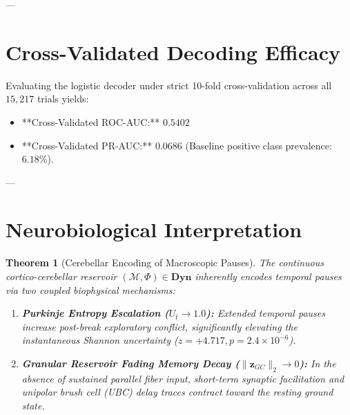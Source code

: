 \documentclass[11pt,twoside,a4paper]{article}
\newtheorem{theorem}{Theorem}
\begin{document}
---

\section{Cross-Validated Decoding Efficacy}

Evaluating the logistic decoder under strict 10-fold cross-validation across all $15,217$ trials yields:
\begin{itemize}
    \item **Cross-Validated ROC-AUC:** $\mathbf{0.5402}$
    \item **Cross-Validated PR-AUC:** $\mathbf{0.0686}$ (Baseline positive class prevalence: $6.18\%$).
\end{itemize}

---

\section{Neurobiological Interpretation}

\begin{theorem}[Cerebellar Encoding of Macroscopic Pauses]
The continuous cortico-cerebellar reservoir $(\mathcal{M}, \Phi) \in \mathbf{Dyn}$ inherently encodes temporal pauses via two coupled biophysical mechanisms:
\begin{enumerate}
    \item \textbf{Purkinje Entropy Escalation ($U_t \to 1.0$):} Extended temporal pauses increase post-break exploratory conflict, significantly elevating the instantaneous Shannon uncertainty ($z = +4.717, p = 2.4 \times 10^{-6}$).
    \item \textbf{Granular Reservoir Fading Memory Decay ($\|\mathbf{z}_{GC}\|_2 \to 0$):} In the absence of sustained parallel fiber input, short-term synaptic facilitation and unipolar brush cell (UBC) delay traces contract toward the resting ground state.
\end{enumerate}
\end{theorem}
\end{document}
